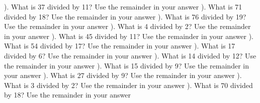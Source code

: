 \documentclass{article}%
\begin{document}
). What is 37 divided by 11? Use the remainder in your answer%
\newline%
\newline%
). What is 71 divided by 18? Use the remainder in your answer%
\newline%
\newline%
). What is 76 divided by 19? Use the remainder in your answer%
\newline%
\newline%
). What is 4 divided by 2? Use the remainder in your answer%
\newline%
\newline%
). What is 45 divided by 11? Use the remainder in your answer%
\newline%
\newline%
). What is 54 divided by 17? Use the remainder in your answer%
\newline%
\newline%
). What is 17 divided by 6? Use the remainder in your answer%
\newline%
\newline%
). What is 14 divided by 12? Use the remainder in your answer%
\newline%
\newline%
). What is 15 divided by 9? Use the remainder in your answer%
\newline%
\newline%
). What is 27 divided by 9? Use the remainder in your answer%
\newline%
\newline%
). What is 3 divided by 2? Use the remainder in your answer%
\newline%
\newline%
). What is 70 divided by 18? Use the remainder in your answer%
\newline%
\newline%
\newline%
\end{document}
